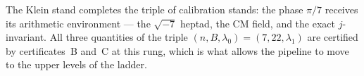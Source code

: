 The Klein stand completes the triple of calibration stands: the
phase $\pi/7$ receives its arithmetic environment --- the
$\sqrt{-7}$ heptad, the CM field, and the exact $j$-invariant. All
three quantities of the triple $(n,B,\lambda_0)=(7,22,\lambda_1)$
are certified by certificates~B and~C at this rung, which is what
allows the pipeline to move to the upper levels of the ladder.

